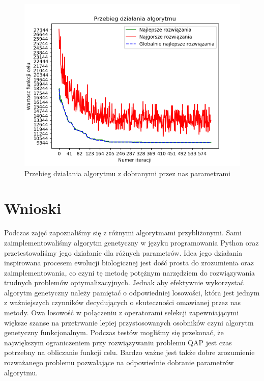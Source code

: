 \documentclass[12pt]{article}
\begin{document}
\begin{figure}[H]
\caption{Przebieg działania algorytmu z dobranymi przez nas parametrami}
\includegraphics[scale=1]{experimental2_v2.png}
\end{figure}
\par
\section{Wnioski}
Podczas zajęć zapoznaliśmy się z różnymi algorytmami przybliżonymi. Sami zaimplementowaliśmy algorytm genetyczny w języku programowania Python oraz przetestowaliśmy jego działanie dla różnych parametrów. Idea jego działania inspirowana procesem ewolucji biologicznej jest dość prosta do zrozumienia oraz zaimplementowania, co czyni tę metodę potężnym narzędziem do rozwiązywania trudnych problemów optymalizacyjnych. Jednak aby efektywnie wykorzystać algorytm genetyczny należy pamiętać o odpowiedniej losowości, która jest jednym z ważniejszych czynników decydujących o skuteczności omawianej przez nas metody. Owa losowość w połączeniu z operatorami selekcji zapewniającymi większe szanse na przetrwanie lepiej przystosowanych osobników czyni algorytm genetyczny funkcjonalnym. Podczas testów mogliśmy się przekonać, że największym ograniczeniem przy rozwiązywaniu problemu QAP jest czas potrzebny na obliczanie funkcji celu. Bardzo ważne jest także dobre zrozumienie rozważanego problemu pozwalające na odpowiednie dobranie parametrów algorytmu.
\end{document}
